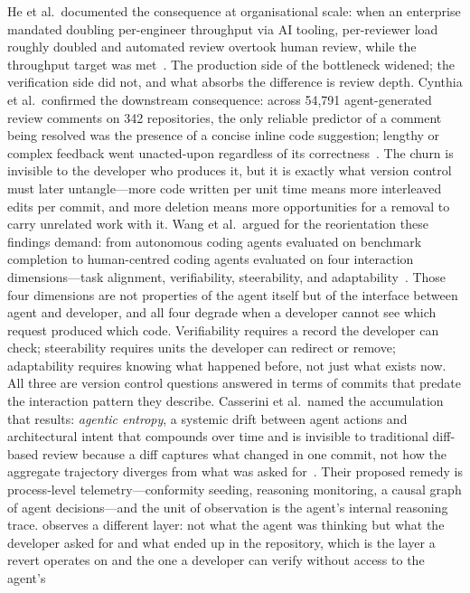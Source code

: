 He et al.\ documented the consequence at organisational
scale: when an enterprise mandated doubling per-engineer throughput via AI
tooling, per-reviewer load roughly doubled and automated review overtook human
review, while the throughput target was met~\cite{he2026review}. The production
side of the bottleneck widened; the verification side did not, and what absorbs
the difference is review depth. Cynthia et al.\ confirmed the downstream
consequence: across 54{,}791 agent-generated review comments on 342 repositories,
the only reliable predictor of a comment being resolved was the presence of a
concise inline code suggestion; lengthy or complex feedback went
unacted-upon regardless of its correctness~\cite{cynthia2026gohome}. The churn
is invisible to the developer who produces it, but it is exactly what version
control must later untangle---more code written per unit time means more
interleaved edits per commit, and more deletion means more opportunities for a
removal to carry unrelated work with it.
Wang et al.\ argued for the reorientation these findings demand: from autonomous
coding agents evaluated on benchmark completion to human-centred coding agents
evaluated on four interaction dimensions---task alignment, verifiability,
steerability, and adaptability~\cite{wang2026humansmissing}. Those four dimensions
are not properties of the agent itself but of the interface between agent and
developer, and all four degrade when a developer cannot see which request produced
which code. Verifiability requires a record the developer can check; steerability
requires units the developer can redirect or remove; adaptability requires knowing
what happened before, not just what exists now. All three are version control
questions answered in terms of commits that predate the interaction pattern they
describe. Casserini et al.\ named the accumulation that results: \emph{agentic
entropy}, a systemic drift between agent actions and architectural intent that
compounds over time and is invisible to traditional diff-based review because a
diff captures what changed in one commit, not how the aggregate trajectory diverges
from what was asked for~\cite{casserini2026entropy}. Their proposed remedy is
process-level telemetry---conformity seeding, reasoning monitoring, a causal graph
of agent decisions---and the unit of observation is the agent's internal reasoning
trace. \sgt{} observes a different layer: not what the agent was thinking but what
the developer asked for and what ended up in the repository, which is the layer a
revert operates on and the one a developer can verify without access to the agent's
